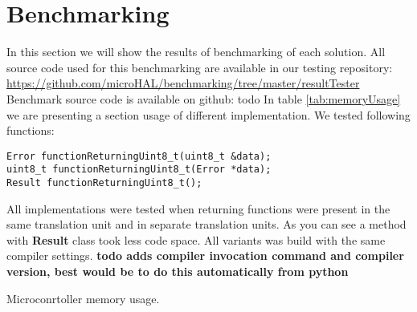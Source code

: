 \documentclass{article}
\let\Oldsection\section
\renewcommand{\section}{\FloatBarrier\Oldsection}
\begin{document}
\section{Benchmarking}
In this section we will show the results of benchmarking of each solution.\newline
All source code used for this benchmarking are available in our testing repository: \url{https://github.com/microHAL/benchmarking/tree/master/resultTester}
Benchmark source code is available on github: todo\newline
In table \ref{tab:memoryUsage} we are presenting a section usage of different implementation. We tested following functions:
\begin{lstlisting}
Error functionReturningUint8_t(uint8_t &data);
uint8_t functionReturningUint8_t(Error *data);
Result functionReturningUint8_t();
\end{lstlisting}

All implementations were tested when returning functions were present in the same translation unit and in separate translation units. As you can see a method with \textbf{Result} class took less code space. All variants was build with the same compiler settings.\newline\newline
\textbf{todo adds compiler invocation command and compiler version, best would be to do this automatically from python}
\newline\newline



\begin{table}[!h]
\centering
\caption{Microconrtoller memory usage.\label{tab:memoryUsage}}
\loadedtable
\pgfplotstabletypeset[
	set thousands separator={\,},
	col sep=&,
	row sep=\\,
	columns={implementation,translation unit,bss,data,text,dec},
	column type/.add={|}{},%
	assign column name/.style={/pgfplots/table/column name={\textbf{#1}}},			
	every head row/.style={before row={
		\hline		
		\multicolumn{2}{|c|}{\textbf{Test configuration}} & \multicolumn{4}{c|}{\textbf{Section size}}\\
		\hline
		},
		after row=\hline
	},
	every last row/.style={after row=\hline},
	every last column/.style={column type/.add={}{|}},
	columns/implementation/.style={
		string type,
		assign cell content/.code={
			\ifnum\pgfplotstablerow=0
				\pgfkeyssetvalue{/pgfplots/table/@cell content}{\multirow{2}{*}{##1}}%
			\fi		
			\ifnum\pgfplotstablerow=2
				\pgfkeyssetvalue{/pgfplots/table/@cell content}{\multirow{2}{*}{##1}}%
			\fi	
			\ifnum\pgfplotstablerow=4
				\pgfkeyssetvalue{/pgfplots/table/@cell content}{\multirow{2}{*}{##1}}%
			\fi	
		},
	},
	columns/translation unit/.style={string type},
	every even row/.style={before row={\hline}},%
]\loadedtable
\end{table}
\end{document}
